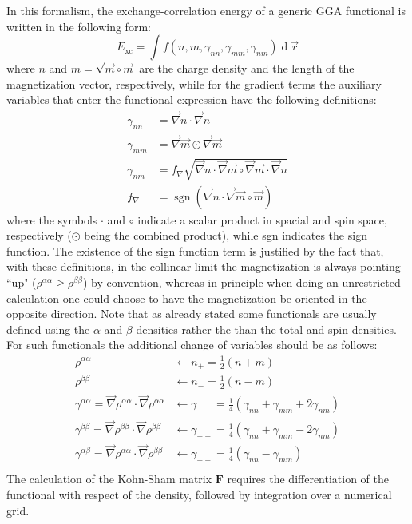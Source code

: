\documentclass[12pt]{article}
\newcommand{\dd}{\operatorname{d}}
\newcommand*{\grad}{\vec{\nabla}}
\begin{document}
In this formalism, the exchange-correlation energy of a generic GGA functional is written in the following form:
\begin{equation}
\label{eq:Exc}
 E_\mathrm{xc} = \int f(n,m,\gamma_{nn},\gamma_{mm},\gamma_{nm})\dd\vec{r}
\end{equation}
where $n$ and $m=\sqrt{\vec{m}\circ\vec{m}}$ are the charge density and the length of the magnetization vector, respectively, while for the gradient terms the auxiliary variables that enter the functional expression have the following definitions:
\begin{equation}
\label{eq:Uvar}
\begin{split}
 \gamma_{nn} &= \grad n\cdot\grad n \\
 \gamma_{mm} &= \grad \vec{m}\odot\grad \vec{m} \\
 \gamma_{nm} &= f_\nabla\sqrt{\grad n\cdot\grad \vec{m}\circ\grad \vec{m}\cdot\grad n} \\
 f_\nabla    &= \operatorname{sgn}(\grad n\cdot\grad \vec{m}\circ\vec{m})
\end{split}
\end{equation}
where the symbols $\cdot$ and $\circ$ indicate a scalar product in spacial and spin space, respectively ($\odot$ being the combined product), while sgn indicates the sign function.
The existence of the sign function term is justified by the fact that, with these definitions, in the collinear limit the magnetization is always pointing ``up" ($\rho^{\alpha\alpha}\ge\rho^{\beta\beta}$) by convention, whereas in principle when doing an unrestricted calculation one could choose to have the magnetization be oriented in the opposite direction.
Note that as already stated some functionals are usually defined using the $\alpha$ and $\beta$ densities rather the than the total and spin densities.
For such functionals the additional change of variables should be as follows:
\begin{equation}
\label{eq:alphabeta}
\begin{split}
 \rho^{\alpha\alpha} &\longleftarrow n_+ = \frac{1}{2}(n + m) \\
 \rho^{\beta\beta}   &\longleftarrow n_- = \frac{1}{2}(n - m) \\
 \gamma^{\alpha\alpha} = \grad\rho^{\alpha\alpha}\cdot\grad\rho^{\alpha\alpha} 
  &\longleftarrow \gamma_{++} = \frac{1}{4}(\gamma_{nn} + \gamma_{mm} + 2\gamma_{nm}) \\
 \gamma^{\beta\beta} = \grad\rho^{\beta\beta}\cdot\grad\rho^{\beta\beta}
  &\longleftarrow \gamma_{--} = \frac{1}{4}(\gamma_{nn} + \gamma_{mm} - 2\gamma_{nm}) \\
 \gamma^{\alpha\beta} = \grad\rho^{\alpha\alpha}\cdot\grad\rho^{\beta\beta}
  &\longleftarrow \gamma_{+-} = \frac{1}{4}(\gamma_{nn} - \gamma_{mm}) \\
\end{split}
\end{equation}
The calculation of the Kohn-Sham matrix $\mathbf{F}$ requires the differentiation of the functional with respect of the density, followed by integration over a numerical grid.
\end{document}
